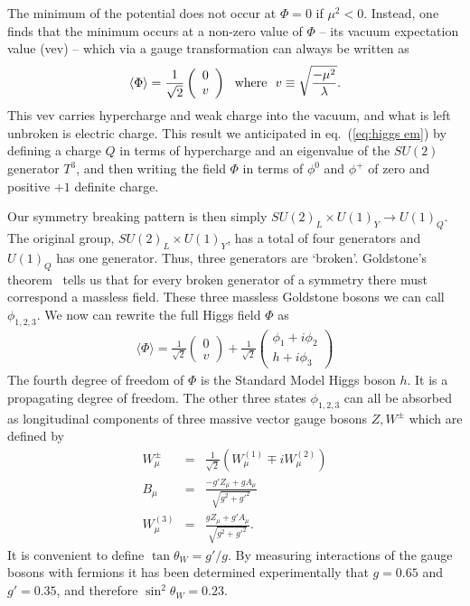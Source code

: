 \documentclass[12pt]{article}
\def\beq{\begin{eqnarray}}
\def\eeq{\end{eqnarray}}
\def\bea{\begin{eqnarray}}
\def\eq#1{eq.~(\ref{#1})}
\begin{document}
The minimum of the potential does not occur at $\Phi=0$ if $\mu^2<0$. Instead, one finds that the minimum occurs at a non-zero value of $\Phi$ -- its vacuum expectation value (vev) -- which via a gauge transformation can always be written as
\beq
\langle \Phi\rangle =\frac{1}{\sqrt{2}}\left( \begin{array}{c} 0 \\ v \end{array}\right)~~{\rm where}~~
v\equiv \sqrt{\frac{-\mu^2}{\lambda}}.
\eeq
This vev carries hypercharge and weak charge into the vacuum, and what is left unbroken is electric charge. This result we anticipated in \eq{eq:higgs em} by defining a charge $Q$ in terms of hypercharge and an eigenvalue of the $SU(2)$ generator $T^3$, and then writing the field $\Phi$ in terms of $\phi^0$ and $\phi^+$ of zero and positive $+1$ definite charge. 

Our symmetry breaking pattern is then simply $SU(2)_L\times U(1)_Y\to U(1)_Q$. The original group, $SU(2)_L\times U(1)_Y$, has a total of four generators and $U(1)_Q$ has one generator. Thus, three generators are `broken'. Goldstone's theorem~\cite{Goldstone:1962es} tells us that for every broken generator of a symmetry there must correspond a massless field.  These three massless Goldstone bosons we can call $\phi_{1,2,3}$. We now can rewrite the full Higgs field $\Phi$ as
\beq
\langle \Phi\rangle =\frac{1}{\sqrt{2}}\left( \begin{array}{c} 0 \\ v\end{array}\right)
+\frac{1}{\sqrt{2}} \left( \begin{array}{c} \phi_1+i\phi_2 \\ h+i\phi_3\end{array}\right)
\eeq
The fourth degree of freedom of $\Phi$ is the Standard Model Higgs boson $h$. It is a propagating degree of freedom. The other three states $\phi_{1,2,3}$ can all be absorbed as longitudinal components of three massive vector gauge bosons $Z,W^\pm$ which are defined by
\bea
W^\pm_\mu & = & \frac{1}{\sqrt{2}}\left( W^{(1)}_\mu\mp i W^{(2)}_\mu\right) \\
B_\mu & = & \frac{-g'Z_\mu+gA_\mu}{\sqrt{g^2+g'^2}} \\
W^{(3)}_\mu & = & \frac{g Z_\mu+g' A_\mu}{\sqrt{g^2+g'^2}}.
\eeq
It is convenient to define $\tan\theta_W=g'/g$. By measuring interactions of the gauge bosons with fermions it has been determined experimentally that $g=0.65$ and $g'=0.35$, and therefore
$\sin^2\theta_W=0.23$. 
\end{document}
